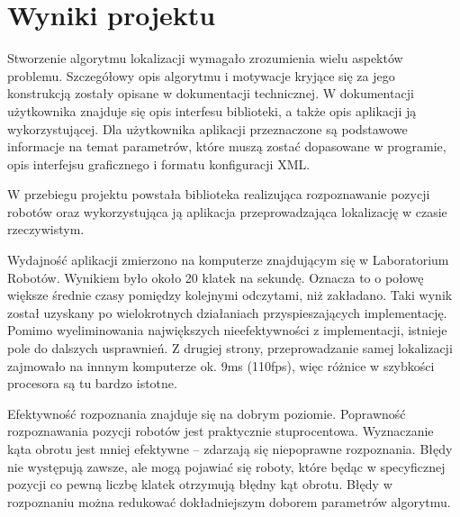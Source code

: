 \documentclass[polish,12pt]{aghthesis}
\begin{document}
\section{Wyniki projektu}

\label{sec:wyniki-projektu}
% 

Stworzenie algorytmu lokalizacji wymagało
zrozumienia wielu aspektów problemu. Szczegółowy opis algorytmu i motywacje 
kryjące się za jego konstrukcją zostały opisane w dokumentacji technicznej. 
W dokumentacji użytkownika znajduje się opis interfesu biblioteki, a także opis
aplikacji ją wykorzystującej. Dla użytkownika aplikacji przeznaczone są 
podstawowe informacje na temat parametrów, które muszą zostać dopasowane w 
programie, opis interfejsu graficznego i formatu konfiguracji XML.

W przebiegu projektu powstała biblioteka realizująca
rozpoznawanie pozycji robotów oraz wykorzystująca ją aplikacja przeprowadzająca
lokalizację w czasie rzeczywistym. 

Wydajność aplikacji zmierzono na komputerze znajdującym się w Laboratorium 
Robotów. Wynikiem było około 20
klatek na sekundę. Oznacza to o połowę większe średnie czasy pomiędzy kolejnymi
odczytami, niż zakładano. Taki wynik został uzyskany po wielokrotnych
działaniach przyspieszających implementację. Pomimo wyeliminowania największych
nieefektywności z implementacji, istnieje pole do dalszych usprawnień. Z drugiej
strony, przeprowadzanie samej lokalizacji zajmowało na innnym
komputerze ok. 9ms (110fps), więc różnice w szybkości procesora są tu bardzo 
istotne.

Efektywność rozpoznania znajduje się na dobrym poziomie. Poprawność 
rozpoznawania pozycji robotów jest praktycznie stuprocentowa. Wyznaczanie kąta 
obrotu jest mniej efektywne -- zdarzają się niepoprawne rozpoznania. Błędy nie 
występują zawsze, ale mogą pojawiać się roboty, które będąc w specyficznej 
pozycji co pewną liczbę klatek otrzymują błędny kąt obrotu. Błędy w rozpoznaniu
można redukować dokładniejszym doborem parametrów algorytmu.
\end{document}
